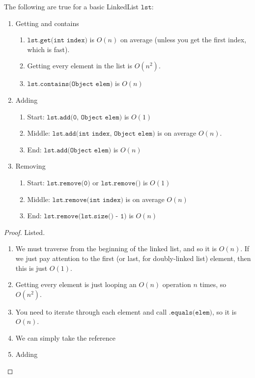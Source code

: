 \documentclass{article}
\begin{document}
    \begin{theorem}
    The following are true for a basic LinkedList $\texttt{lst}$:  
    \begin{enumerate}
        \item Getting and contains 
        \begin{enumerate}
            \item $\texttt{lst.get(int index)}$ is $O(n)$ on average (unless you get the first index, which is fast).  
            \item Getting every element in the list is $O(n^2)$. 
            \item $\texttt{lst.contains(Object elem)}$ is $O(n)$ 
        \end{enumerate}
        
        \item Adding 
        \begin{enumerate}
            \item Start:  $\texttt{lst.add(0, Object elem)}$ is $O(1)$ 
            \item Middle: $\texttt{lst.add(int index, Object elem)}$ is on average $O(n)$. 
            \item End:    $\texttt{lst.add(Object elem)}$ is $O(n)$
        \end{enumerate}
        
        \item Removing 
        \begin{enumerate}
            \item Start:  $\texttt{lst.remove(0)}$ or $\texttt{lst.remove()}$ is $O(1)$ 
            \item Middle: $\texttt{lst.remove(int index)}$ is on average $O(n)$ 
            \item End:    $\texttt{lst.remove(lst.size() - 1)}$ is $O(n)$ 
        \end{enumerate}
    \end{enumerate}
    \end{theorem}
    \begin{proof}
    Listed. 
    \begin{enumerate}
        \item We must traverse from the beginning of the linked list, and so it is $O(n)$. If we just pay attention to the first (or last, for doubly-linked list) element, then this is just $O(1)$. 
        \item Getting every element is just looping an $O(n)$ operation $n$ times, so $O(n^2)$. 
        \item You need to iterate through each element and call $\texttt{.equals(elem)}$, so it is $O(n)$. 
        \item We can simply take the reference 
        \item Adding 
    \end{enumerate}
    \end{proof}
\end{document}

